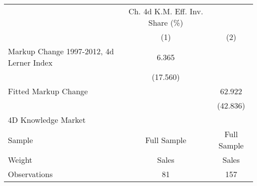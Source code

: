 {
\def\sym#1{\ifmmode^{#1}\else\(^{#1}\)\fi}
\begin{tabular}{l*{2}{c}}
\hline\hline
                    &Ch. 4d K.M. Eff. Inv. Share (\%)   &               \\
                    &\multicolumn{1}{c}{(1)}   &\multicolumn{1}{c}{(2)}   \\
\hline
Markup Change 1997-2012, 4d Lerner Index&       6.365   &               \\
                    &    (17.560)   &               \\
Fitted Markup Change&               &      62.922   \\
                    &               &    (42.836)   \\
\hline
4D Knowledge Market &               &               \\
Sample              & Full Sample   & Full Sample   \\
Weight              &       Sales   &       Sales   \\
Observations        &          81   &         157   \\
\hline\hline
\end{tabular}
}
